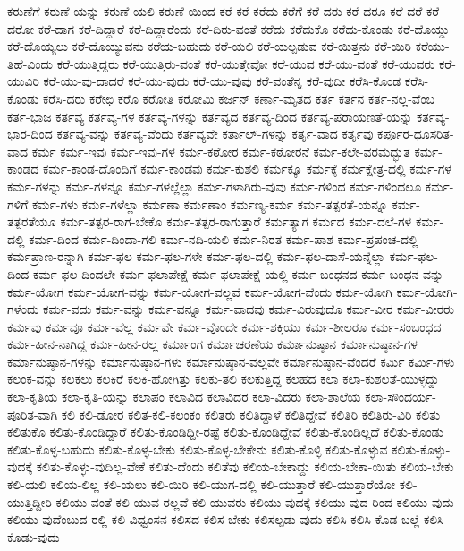 {ಕರುಣೆಗೆ
ಕರುಣೆ-ಯನ್ನು
ಕರುಣೆ-ಯಲಿ
ಕರುಣೆ-ಯಿಂದ
ಕರೆ
ಕರೆ-ಕರೆದು
ಕರೆಗೆ
ಕರೆ-ದರು
ಕರೆ-ದರೂ
ಕರೆ-ದರೆ
ಕರೆ-ದರೋ
ಕರೆ-ದಾಗ
ಕರೆ-ದಿದ್ದಾರೆ
ಕರೆ-ದಿದ್ದಾರೆಂದು
ಕರೆ-ದಿರು-ವಂತೆ
ಕರೆದು
ಕರೆದುಕೊ
ಕರೆದು-ಕೊಂಡು
ಕರೆ-ದೊಯ್ದು
ಕರೆ-ದೊಯ್ಯಲು
ಕರೆ-ದೊಯ್ಯುವನು
ಕರೆಯ-ಬಹುದು
ಕರೆ-ಯಲಿ
ಕರೆ-ಯಲ್ಪಡುವ
ಕರೆ-ಯಿತ್ತನು
ಕರೆ-ಯಿರಿ
ಕರೆಯು-ತಿಹೆ-ವಿಂದು
ಕರೆ-ಯುತ್ತಿದ್ದರು
ಕರೆ-ಯುತ್ತಿರು-ವಂತೆ
ಕರೆ-ಯುತ್ತೇವೋ
ಕರೆ-ಯುವ
ಕರೆ-ಯು-ವಂತೆ
ಕರೆ-ಯುವರು
ಕರೆ-ಯುವಿರಿ
ಕರೆ-ಯು-ವು-ದಾದರೆ
ಕರೆ-ಯು-ವುದು
ಕರೆ-ಯು-ವುವು
ಕರೆ-ವಂತೆನ್ನ
ಕರೆ-ವುದೀ
ಕರೆಸಿ-ಕೊಂಡ
ಕರೆಸಿ-ಕೊಂಡು
ಕರೆಸಿ-ದರು
ಕರೇಛಿ
ಕರೊ
ಕರೋತಿ
ಕರೋಮಿ
ಕರ್ಜನ್
ಕರ್ಣಾ-ಮೃತದ
ಕರ್ತ
ಕರ್ತನ
ಕರ್ತ-ನಲ್ಲ-ವೆಂಬ
ಕರ್ತ-ಭಾಜ
ಕರ್ತವ್ಯ
ಕರ್ತವ್ಯ-ಗಳ
ಕರ್ತವ್ಯ-ಗಳನ್ನು
ಕರ್ತವ್ಯದ
ಕರ್ತವ್ಯ-ದಿಂದ
ಕರ್ತವ್ಯ-ಪರಾಯಣತೆ-ಯನ್ನು
ಕರ್ತವ್ಯ-ಭಾರ-ದಿಂದ
ಕರ್ತವ್ಯ-ವನ್ನು
ಕರ್ತವ್ಯ-ವೆಂದು
ಕರ್ತವ್ಯವೇ
ಕರ್ತಾಲ್-ಗಳನ್ನು
ಕರ್ತೃ-ವಾದ
ಕರ್ತೃವು
ಕರ್ಪೂರ-ಧೂಸರಿತ-ವಾದ
ಕರ್ಮ
ಕರ್ಮ-ಇವು
ಕರ್ಮ-ಇವು-ಗಳ
ಕರ್ಮ-ಕಠೋರ
ಕರ್ಮ-ಕಠೋರನೆ
ಕರ್ಮ-ಕಲೇ-ವರಮದ್ಭುತ
ಕರ್ಮ-ಕಾಂಡದ
ಕರ್ಮ-ಕಾಂಡ-ದೊಂದಿಗೆ
ಕರ್ಮ-ಕಾಂಡವು
ಕರ್ಮ-ಕುಶಲಿ
ಕರ್ಮಕ್ಕೂ
ಕರ್ಮಕ್ಕೆ
ಕರ್ಮಕ್ಷೇತ್ರ-ದಲ್ಲಿ
ಕರ್ಮ-ಗಳ
ಕರ್ಮ-ಗಳನ್ನು
ಕರ್ಮ-ಗಳನ್ನೂ
ಕರ್ಮ-ಗಳಲ್ಲೆಲ್ಲಾ
ಕರ್ಮ-ಗಳಾಗಿರು-ವುವು
ಕರ್ಮ-ಗಳಿಂದ
ಕರ್ಮ-ಗಳಿಂದಲೂ
ಕರ್ಮ-ಗಳಿಗೆ
ಕರ್ಮ-ಗಳು
ಕರ್ಮ-ಗಳೆಲ್ಲಾ
ಕರ್ಮಣಾ
ಕರ್ಮಣಾಂ
ಕರ್ಮಣ್ಯ-ಕರ್ಮ
ಕರ್ಮ-ತತ್ಪರತೆ-ಯನ್ನೂ
ಕರ್ಮ-ತತ್ಪರತೆಯೂ
ಕರ್ಮ-ತತ್ಪರ-ರಾಗ-ಬೇಕೊ
ಕರ್ಮ-ತತ್ಪರ-ರಾಗುತ್ತಾರೆ
ಕರ್ಮತ್ಯಾಗ
ಕರ್ಮದ
ಕರ್ಮ-ದಲೆ-ಗಳ
ಕರ್ಮ-ದಲ್ಲಿ
ಕರ್ಮ-ದಿಂದ
ಕರ್ಮ-ದಿಂದಾ-ಗಲಿ
ಕರ್ಮ-ನದಿ-ಯಲಿ
ಕರ್ಮ-ನಿರತ
ಕರ್ಮ-ಪಾಶ
ಕರ್ಮ-ಪ್ರಪಂಚ-ದಲ್ಲಿ
ಕರ್ಮಪ್ರಾಣ-ರನ್ನಾಗಿ
ಕರ್ಮ-ಫಲ
ಕರ್ಮ-ಫಲ-ಗಳೇ
ಕರ್ಮ-ಫಲ-ದಲ್ಲಿ
ಕರ್ಮ-ಫಲ-ದಾಸೆ-ಯನ್ನೆಲ್ಲಾ
ಕರ್ಮ-ಫಲ-ದಿಂದ
ಕರ್ಮ-ಫಲ-ದಿಂದಲೇ
ಕರ್ಮ-ಫಲಾಪೇಕ್ಷೆ
ಕರ್ಮ-ಫಲಾಪೇಕ್ಷೆ-ಯಲ್ಲಿ
ಕರ್ಮ-ಬಂಧನದ
ಕರ್ಮ-ಬಂಧನ-ವನ್ನು
ಕರ್ಮ-ಯೋಗ
ಕರ್ಮ-ಯೋಗ-ವನ್ನು
ಕರ್ಮ-ಯೋಗ-ವಲ್ಲವೆ
ಕರ್ಮ-ಯೋಗ-ವೆಂದು
ಕರ್ಮ-ಯೋಗಿ
ಕರ್ಮ-ಯೋಗಿ-ಗಳೆಂದು
ಕರ್ಮ-ವದು
ಕರ್ಮ-ವನ್ನು
ಕರ್ಮ-ವನ್ನೂ
ಕರ್ಮ-ವಾದವು
ಕರ್ಮ-ವಿರುವುದೊ
ಕರ್ಮ-ವೀರ
ಕರ್ಮ-ವೀರರು
ಕರ್ಮವು
ಕರ್ಮವೂ
ಕರ್ಮ-ವೆಲ್ಲ
ಕರ್ಮವೇ
ಕರ್ಮ-ವೊಂದೇ
ಕರ್ಮ-ಶಕ್ತಿಯು
ಕರ್ಮ-ಶೀಲರೂ
ಕರ್ಮ-ಸಂಬಂಧದ
ಕರ್ಮ-ಹೀನ-ನಾಗಿದ್ದ
ಕರ್ಮ-ಹೀನ-ರಲ್ಲ
ಕರ್ಮಾಂಗ
ಕರ್ಮಾಚರಣೆಯ
ಕರ್ಮಾನುಷ್ಠಾನ
ಕರ್ಮಾನುಷ್ಠಾನ-ಗಳ
ಕರ್ಮಾನುಷ್ಠಾನ-ಗಳನ್ನು
ಕರ್ಮಾನುಷ್ಠಾನ-ಗಳು
ಕರ್ಮಾನುಷ್ಠಾನ-ವಲ್ಲವೇ
ಕರ್ಮಾನುಷ್ಠಾನ-ವೆಂದರೆ
ಕರ್ಮಿ
ಕರ್ಮಿ-ಗಳು
ಕಲಂಕ-ವನ್ನು
ಕಲಕಲು
ಕಲಕಿರೆ
ಕಲಕಿ-ಹೋಗಿತ್ತು
ಕಲಕು-ತಲಿ
ಕಲಕುತ್ತಿದ್ದ
ಕಲಹದ
ಕಲಾ
ಕಲಾ-ಕುಶಲತೆ-ಯುಳ್ಳದ್ದು
ಕಲಾ-ಕೃತಿಯ
ಕಲಾ-ಕೃತಿ-ಯನ್ನು
ಕಲಾಪಂ
ಕಲಾವಿದ
ಕಲಾವಿದರ
ಕಲಾ-ವಿದರು
ಕಲಾ-ಶಾಲೆಯ
ಕಲಾ-ಸೌಂದರ್ಯ-ಪೂರಿತ-ವಾಗಿ
ಕಲಿ
ಕಲಿ-ಡೋರ
ಕಲಿತ-ಕಲಿ-ಕಲಂಕಂ
ಕಲಿತರು
ಕಲಿತಿದ್ದಾಳೆ
ಕಲಿತಿದ್ದೇವೆ
ಕಲಿತಿರಿ
ಕಲಿತಿರು-ವಿರಿ
ಕಲಿತು
ಕಲಿತುಕೊ
ಕಲಿತು-ಕೊಂಡಿದ್ದಾರೆ
ಕಲಿತು-ಕೊಂಡಿದ್ದೀ-ರಷ್ಟೆ
ಕಲಿತು-ಕೊಂಡಿದ್ದೇವೆ
ಕಲಿತು-ಕೊಂಡಿಲ್ಲದೆ
ಕಲಿತು-ಕೊಂಡು
ಕಲಿತು-ಕೊಳ್ಳ-ಬಹುದು
ಕಲಿತು-ಕೊಳ್ಳ-ಬೇಕು
ಕಲಿತು-ಕೊಳ್ಳ-ಬೇಕೇನು
ಕಲಿತು-ಕೊಳ್ಳಿ
ಕಲಿತು-ಕೊಳ್ಳುವ
ಕಲಿತು-ಕೊಳ್ಳು-ವುದಕ್ಕೆ
ಕಲಿತು-ಕೊಳ್ಳು-ವುದಿಲ್ಲ-ವೇಕೆ
ಕಲಿತು-ದೆಂದು
ಕಲಿತೆವು
ಕಲಿಯ-ಬೇಕಾದ್ದು
ಕಲಿಯ-ಬೇಕಾ-ಯಿತು
ಕಲಿಯ-ಬೇಕು
ಕಲಿ-ಯಲಿ
ಕಲಿಯ-ಲಿಲ್ಲ
ಕಲಿ-ಯಲು
ಕಲಿ-ಯಿರಿ
ಕಲಿ-ಯುಗ-ದಲ್ಲಿ
ಕಲಿ-ಯುತ್ತಾರೆ
ಕಲಿ-ಯುತ್ತಾರೆಯೋ
ಕಲಿ-ಯುತ್ತಿದ್ದೀರಿ
ಕಲಿಯು-ವಂತೆ
ಕಲಿ-ಯುವ-ರಲ್ಲವೆ
ಕಲಿ-ಯುವರು
ಕಲಿಯು-ವುದಕ್ಕೆ
ಕಲಿಯು-ವುದ-ರಿಂದ
ಕಲಿಯು-ವುದು
ಕಲಿಯು-ವುದೆಂಬುದ-ರಲ್ಲಿ
ಕಲಿ-ವಿಧ್ವಂಸನ
ಕಲಿಸದ
ಕಲಿಸ-ಬೇಕು
ಕಲಿಸಲ್ಪಡು-ವುದು
ಕಲಿಸಿ
ಕಲಿಸಿ-ಕೊಡ-ಬಲ್ಲೆ
ಕಲಿಸಿ-ಕೊಡು-ವುದು
}
